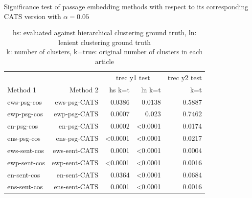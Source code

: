 \begin{small}
\begin{table}[t]
\centering
\caption{Significance test of passage embedding methods with respect to its corresponding CATS version with $\alpha = 0.05$}
\label{tab:sigt}
\begin{tabular}{@{}lrrrr@{}}\toprule
&& \multicolumn{2}{c}{trec y1 test} & trec y2 test  \\
\cmidrule(r){3-4}
\cmidrule(r){5-5}
Method 1 & Method 2 & hs k=t & ln k=t & k=t \\\midrule
ews-psg-cos & ews-psg-CATS & 0.0386 & 0.0138 & 0.5887 \\ 
ewp-psg-cos & ewp-psg-CATS & 0.0007 & 0.023 & 0.7462 \\ 
en-psg-cos & en-psg-CATS & 0.0002 & <0.0001 & 0.0174 \\ 
ens-psg-cos & ens-psg-CATS & <0.0001 & <0.0001 & 0.0217 \\
ews-sent-cos & ews-sent-CATS & 0.0001 & <0.0001 & 0.0004 \\
ewp-sent-cos & ewp-sent-CATS & <0.0001 & <0.0001 & 0.0016 \\
en-sent-cos & en-sent-CATS & 0.0364 & <0.0001 & 0.0684 \\
ens-sent-cos & ens-sent-CATS & 0.0001 & <0.0001 & 0.0016 \\
\bottomrule
\end{tabular}
\caption*{hs: evaluated against hierarchical clustering ground truth, ln: lenient clustering ground truth\\
k: number of clusters, k=true: original number of clusters in each article}
\end{table}
\end{small}

